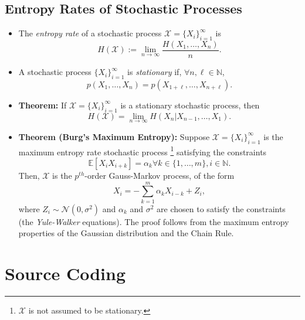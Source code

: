 \documentclass{article}
\newcommand{\N}{\mathbb{N}}                         %
\newcommand{\X}{\mathcal{X}}                        %
\newcommand{\E}{\mathbb{E}}                         %
\begin{document}
\subsection{Entropy Rates of Stochastic Processes}
\begin{itemize}
\item The \emph{entropy rate} of a stochastic process
$\X = \{X_i\}_{i = 1}^\infty$ is
\[H(\X) := \lim_{n \to \infty} \frac{H(X_1,\dots,X_n)}{n}.\]
\item A stochastic process $\{X_i\}_{i = 1}^\infty$ is \emph{stationary}
if, $\forall n, \ell \in \N$,
\[p(X_1,\dots,X_n) = p(X_{1 + \ell},\dots,X_{n + \ell}).\]
\item {\bf Theorem:} If $\X = \{X_i\}_{i = 1}^\infty$ is a stationary
stochastic process, then
\[H(\X) = \lim_{n \to \infty} H(X_n | X_{n - 1},\dots,X_1).\]
\item {\bf Theorem (Burg's Maximum Entropy):} Suppose
$\X = \{X_i\}_{i = 1}^\infty$ is the maximum entropy rate stochastic process
\footnote{$\X$ is not assumed to be stationary.}
satisfying the constraints
\[\E[X_iX_{i + k}] = \alpha_k \forall k \in \{1,\dots,m\}, i \in \N.\]
Then, $\X$ is the $p^{th}$-order Gauss-Markov process, of the form
\[X_i = - \sum_{k = 1}^m \alpha_k X_{i - k} + Z_i,\]
where $Z_i \sim \mathcal{N}(0,\sigma^2)$ and $\alpha_k$ and $\sigma^2$ are
chosen to satisfy the constraints (the \emph{Yule-Walker} equations). The proof
follows from the maximum entropy properties of the Gaussian distribution and
the Chain Rule.
\end{itemize}
\section{Source Coding}
\end{document}
